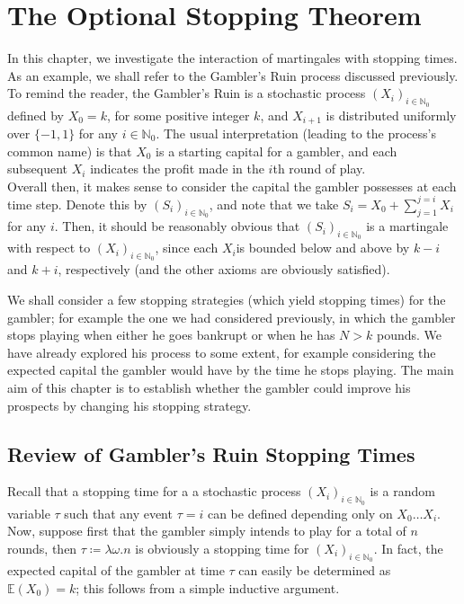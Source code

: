 \chapter{ The Optional Stopping Theorem}

In this chapter, we investigate the interaction of martingales with stopping times. As an example, 
we shall refer to the Gambler's Ruin process discussed previously. To remind the reader, the 
Gambler's Ruin is a stochastic process $(X_i)_{i\in\mathbb{N}_0}$ defined by $X_0 = k$, for some 
positive integer $k$, and $X_{i+1}$ is distributed uniformly over $\{-1, 1\}$ for any $i \in 
\mathbb{N}_0$. The usual interpretation (leading to the process's common name) is that $X_0$ is a 
starting capital for a gambler, and each subsequent $X_i$ indicates the profit made in the $i$th 
round of play. \\
Overall then, it makes sense to consider the capital the gambler possesses at each time step. 
Denote this by $(S_i)_{i\in \mathbb{N}_0}$, and note that we take $S_i = X_0 + \sum_{j=1}^{j=i}X_i$
for any $i$. Then, it should be reasonably obvious that $(S_i)_{i\in\mathbb{N}_0}$ is a martingale
with respect to $(X_i)_{i\in\mathbb{N}_0}$, since each $X_i$is bounded below and above by $k-i$ and
$k+i$, respectively (and the other axioms are obviously satisfied). 

We shall consider a few stopping strategies (which yield stopping times) for the gambler; for 
example the one we had considered previously, in which the gambler stops playing when either he 
goes bankrupt or when he has $N > k$ pounds. We have already explored his process to some extent, 
for example considering the expected capital the gambler would have by the time he stops playing. 
The main aim of this chapter is to establish whether the gambler could improve his prospects by 
changing his stopping strategy.

\section{Review of Gambler's Ruin Stopping Times}
	Recall that a stopping time for a a stochastic process $(X_i)_{i\in \mathbb{N}_0}$ is a 
	random variable $\tau$ such that any event $\tau = i$ can be defined depending only on $X_0
	\hdots X_i$. \\
	Now, suppose first that the gambler simply intends to play for a total of $n$ rounds, then 
	$\tau \coloneqq \lambda \omega . n$ is obviously a stopping time for 
	$(X_i)_{i\in\mathbb{N}_0}$. In fact, the expected capital of the gambler at time $\tau$ can
	easily be determined as $\mathbb{E}(X_0) = k$; this follows from a simple inductive 
	argument. 

